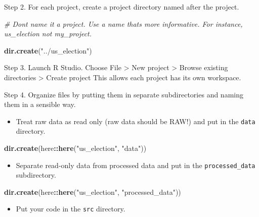 \documentclass[
]{book}
\newenvironment{Shaded}{\begin{snugshade}}{\end{snugshade}}
\newcommand{\CommentTok}[1]{\textcolor[rgb]{0.56,0.35,0.01}{\textit{#1}}}
\newcommand{\KeywordTok}[1]{\textcolor[rgb]{0.13,0.29,0.53}{\textbf{#1}}}
\newcommand{\NormalTok}[1]{#1}
\newcommand{\OperatorTok}[1]{\textcolor[rgb]{0.81,0.36,0.00}{\textbf{#1}}}
\newcommand{\StringTok}[1]{\textcolor[rgb]{0.31,0.60,0.02}{#1}}
\providecommand{\tightlist}{%
  \setlength{\itemsep}{0pt}\setlength{\parskip}{0pt}}
\begin{document}
Step 2. For each project, create a project directory named after the project.

\begin{Shaded}
\begin{Highlighting}[]
\CommentTok{\# Don\textquotesingle{}t name it a project. Use a name that\textquotesingle{}s more informative. For instance, us\_election not my\_project.}

\KeywordTok{dir.create}\NormalTok{(}\StringTok{"../us\_election"}\NormalTok{)}
\end{Highlighting}
\end{Shaded}

Step 3. Launch R Studio. Choose File \textgreater{} New project \textgreater{} Browse existing directories \textgreater{} Create project This allows each project has its own workspace.

Step 4. Organize files by putting them in separate subdirectories and naming them in a sensible way.

\begin{itemize}
\tightlist
\item
  Treat raw data as read only (raw data should be RAW!) and put in the \texttt{data} directory.
\end{itemize}

\begin{Shaded}
\begin{Highlighting}[]
\KeywordTok{dir.create}\NormalTok{(here}\OperatorTok{::}\KeywordTok{here}\NormalTok{(}\StringTok{"us\_election"}\NormalTok{, }\StringTok{"data"}\NormalTok{))}
\end{Highlighting}
\end{Shaded}

\begin{itemize}
\tightlist
\item
  Separate read-only data from processed data and put in the \texttt{processed\_data} subdirectory.
\end{itemize}

\begin{Shaded}
\begin{Highlighting}[]
\KeywordTok{dir.create}\NormalTok{(here}\OperatorTok{::}\KeywordTok{here}\NormalTok{(}\StringTok{"us\_election"}\NormalTok{, }\StringTok{"processed\_data"}\NormalTok{))}
\end{Highlighting}
\end{Shaded}

\begin{itemize}
\tightlist
\item
  Put your code in the \texttt{src} directory.
\end{itemize}
\end{document}
